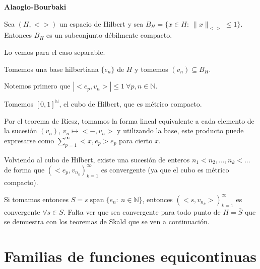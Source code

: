 \documentclass[openany]{book}
\begin{document}
\begin{theorem}
    \textbf{Alaoglo-Bourbaki}

    Sea $ (H,<>) $ un espacio de Hilbert y sea $ B_{H} = \{x \in H:\ \|x\|_{<>} \leq  1\} $. Entonces $ B_{H} $ es un subconjunto débilmente compacto.
\end{theorem}



\begin{demonstration}

    Lo vemos para el caso separable.

    Tomemos una base hilbertiana $ \{e_n\} $ de $ H $ y tomemos $ (v_n) \subseteq  B_{H} $.
    
    Notemos primero que $ |<e_{p},v_n>| \leq  1\ \forall p,n \in \mathbb{N} $. 

    Tomemos $ [0,1]^{\mathbb{N}} $, el cubo de Hilbert, que es métrico compacto.

    Por el teorema de Riesz, tomamos la forma lineal equivalente a cada elemento de la sucesión $ (v_n) $, $ v_n \mapsto <-,v_n > $ y utilizando la base, este producto puede expresarse como $ \sum\limits_{p=1}^{\infty} <x,e_{p}>e_{p} $ para cierto $ x $.

    Volviendo al cubo de Hilbert, existe una sucesión de enteros $ n_1<n_2,...,n_{k}<... $ de forma que $ (<e_{p},v_{n_{k}})_{k=1}^{\infty} $ es convergente (ya que el cubo es métrico compacto).

    Si tomamos entonces $ S = s\operatorname{span}\{e_n:\ n \in \mathbb{N}\} $, entonces $ (<s,v_{n_{k}}>)_{k=1}^{\infty} $ es convergente $ \forall  s \in S $. Falta ver que sea convergente para todo punto de $ H = \overline{S} $ que se demuestra con los teoremas de Skald que se ven a continuación.

\end{demonstration}

\section{Familias de funciones equicontinuas}
\end{document}
